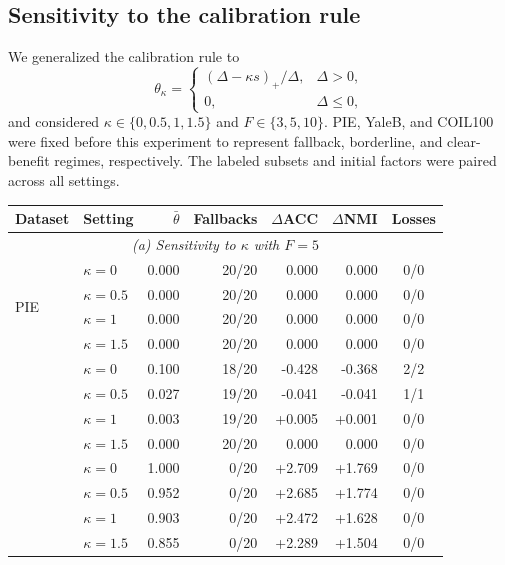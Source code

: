 \documentclass[11pt]{article}
\newenvironment{widetable}
  {\begin{strip}\centering\captionsetup{type=table}}
  {\end{strip}}
\theoremstyle{remark}
\begin{document}
\subsection{Sensitivity to the calibration rule}

We generalized the calibration rule to
\[
\theta_{\kappa}=
\begin{cases}
(\Delta-\kappa s)_{+}/\Delta,&\Delta>0,\\
0,&\Delta\le0,
\end{cases}
\]
and considered $\kappa\in\{0,0.5,1,1.5\}$ and $F\in\{3,5,10\}$. PIE, YaleB, and COIL100 were fixed before this experiment to represent fallback, borderline, and clear-benefit regimes, respectively. The labeled subsets and initial factors were paired across all settings.

\begin{widetable}
\centering
\caption{Sensitivity of conservative calibration to the shrinkage strength $\kappa$ and the number of folds $F$.}
\label{tab:sensitivity}
\scriptsize
\setlength{\tabcolsep}{24.2pt}
\begin{tabular}{llrrrrc}
\toprule
Dataset & Setting & $\bar\theta$ & Fallbacks & $\Delta$ACC & $\Delta$NMI & Losses \\
\midrule
\multicolumn{7}{c}{\textit{(a) Sensitivity to $\kappa$ with $F=5$}} \\
\midrule
\multirow{4}{*}{PIE}
& $\kappa=0$ & 0.000 & 20/20 & 0.000 & 0.000 & 0/0 \\
& $\kappa=0.5$ & 0.000 & 20/20 & 0.000 & 0.000 & 0/0 \\
& $\kappa=1$ & 0.000 & 20/20 & 0.000 & 0.000 & 0/0 \\
& $\kappa=1.5$ & 0.000 & 20/20 & 0.000 & 0.000 & 0/0 \\
\addlinespace
\multirow{4}{*}{YaleB}
& $\kappa=0$ & 0.100 & 18/20 & -0.428 & -0.368 & 2/2 \\
& $\kappa=0.5$ & 0.027 & 19/20 & -0.041 & -0.041 & 1/1 \\
& $\kappa=1$ & 0.003 & 19/20 & +0.005 & +0.001 & 0/0 \\
& $\kappa=1.5$ & 0.000 & 20/20 & 0.000 & 0.000 & 0/0 \\
\addlinespace
\multirow{4}{*}{COIL100}
& $\kappa=0$ & 1.000 & 0/20 & +2.709 & +1.769 & 0/0 \\
& $\kappa=0.5$ & 0.952 & 0/20 & +2.685 & +1.774 & 0/0 \\
& $\kappa=1$ & 0.903 & 0/20 & +2.472 & +1.628 & 0/0 \\
& $\kappa=1.5$ & 0.855 & 0/20 & +2.289 & +1.504 & 0/0 \\

\end{tabular}
\end{widetable}
\end{document}
